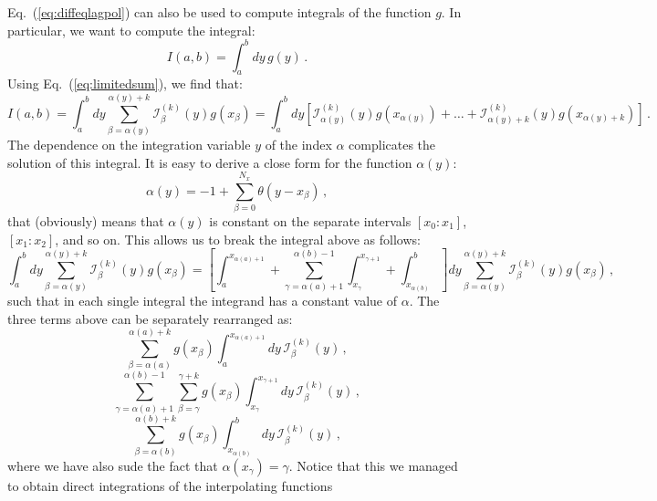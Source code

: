 \documentclass[10pt,a4paper]{article}
\begin{document}
Eq.~(\ref{eq:diffeqlagpol}) can also be used to compute integrals of
the function $g$. In particular, we want to compute the integral:
\begin{equation}\label{eq:IntegralInt}
I(a,b) = \int_a^b dy\,g(y)\,.
\end{equation}
Using Eq.~(\ref{eq:limitedsum}), we find that:
\begin{equation}
  I(a,b)=
  \int_a^b dy
  \sum_{\beta=\alpha(y)}^{\alpha(y)+k}\mathcal{I}_\beta^{(k)}(y)
  g(x_{\beta}) = \int_a^b dy\left[\mathcal{I}_{\alpha(y)}^{(k)}(y)
  g(x_{\alpha(y)})+\dots+\mathcal{I}_{\alpha(y)+k}^{(k)}(y)
  g(x_{\alpha(y)+k})\right]\,.
\end{equation}
The dependence on the integration variable $y$ of the index $\alpha$
complicates the solution of this integral. It is easy to derive a
close form for the function $\alpha(y)$:
\begin{equation}
\alpha(y) = -1 + \sum_{\beta = 0}^{N_x}\theta(y-x_\beta)\,,
\end{equation}
that (obviously) means that $\alpha(y)$ is constant on the separate
intervals $[x_0:x_1]$, $[x_1:x_2]$, and so on. This allows us to break
the integral above as follows:
\begin{equation}
\int_a^b dy \sum_{\beta=\alpha(y)}^{\alpha(y)+k}\mathcal{I}_\beta^{(k)}(y)
  g(x_{\beta})= \left[\int_a^{x_{\alpha(a)+1}}+ \sum_{\gamma=\alpha(a)+1}^{\alpha(b)-1}\int_{x_\gamma}^{x_{\gamma+1}}+\int_{x_{\alpha(b)}}^b\right]dy \sum_{\beta=\alpha(y)}^{\alpha(y)+k}\mathcal{I}_\beta^{(k)}(y)
  g(x_{\beta})\,,
\end{equation}
such that in each single integral the integrand has a constant value
of $\alpha$. The three terms above can be separately rearranged as:
\begin{equation}
\sum_{\beta=\alpha(a)}^{\alpha(a)+k}g(x_{\beta})\int_a^{x_{\alpha(a)+1}}dy\,\mathcal{I}_\beta^{(k)}(y)\,,
\end{equation}
\begin{equation}
\sum_{\gamma=\alpha(a)+1}^{\alpha(b)-1}\sum_{\beta=\gamma}^{\gamma+k}g(x_{\beta})\int_{x_\gamma}^{x_{\gamma+1}}dy\,\mathcal{I}_\beta^{(k)}(y)\,,
\end{equation}
\begin{equation}
\sum_{\beta=\alpha(b)}^{\alpha(b)+k}g(x_{\beta})\int_{x_{\alpha(b)}}^bdy\,
\mathcal{I}_\beta^{(k)}(y)\,,
\end{equation}
where we have also sude the fact that
$\alpha(x_\gamma)=\gamma$. Notice that this we managed to obtain
direct integrations of the interpolating functions
\end{document}

